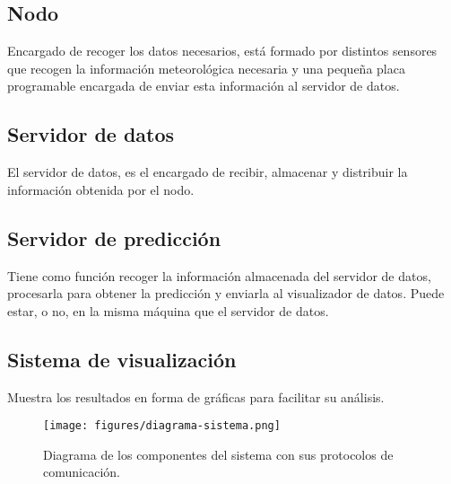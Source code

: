 \subsection{Nodo}
\label{makereference1.2.1}
Encargado de recoger los datos necesarios, está formado por distintos sensores que recogen la información meteorológica necesaria y una pequeña placa programable encargada de enviar esta información al servidor de datos.

\subsection{Servidor de datos}
\label{makereference1.2.2}
El servidor de datos, es el encargado de recibir, almacenar y distribuir la información obtenida por el nodo.

\subsection{Servidor de predicción}
\label{makereference1.2.3}
Tiene como función recoger la información almacenada del servidor de datos, procesarla para obtener la predicción y enviarla al visualizador de datos. Puede estar, o no, en la misma máquina que el servidor de datos.

\subsection{Sistema de visualización}
\label{makereference1.2.4}
Muestra los resultados en forma de gráficas para facilitar su análisis.

\begin{figure}[htb]
    \begin{center}
        \texttt{[image: figures/diagrama-sistema.png]}
        \caption{Diagrama de los componentes del sistema con sus protocolos de comunicación. \label{diagrama-sistema}}
    \end{center}
\end{figure}

